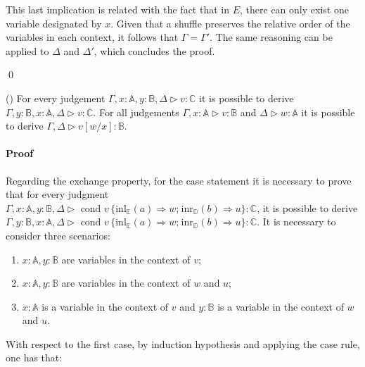 This last implication is related with the fact that in $E$, there can only exist one  variable designated by $x$. Given that a shuffle preserves the relative order of the variables in each context, it follows that $\Gamma = \Gamma'$. The same reasoning can be applied to $\Delta$ and $\Delta'$, which concludes the proof. 

\qed



\begin{lemma} \label {exh_and_sub} () For every judgement $\Gamma,x:\mathbb{A}, y:\mathbb{B}, \Delta \triangleright v: \mathbb{C}$ it is possible to derive $\Gamma, y:\mathbb{B}, x:\mathbb{A}, \Delta \triangleright v: \mathbb{C}$. For all judgements  $\Gamma,x:\mathbb{A} \triangleright v: \mathbb{B}$ and $\Delta \triangleright w: \mathbb{A}$ it is possible to derive $ \Gamma, \Delta \triangleright v[w/x]: \mathbb{B}$.
\end{lemma}

\paragraph{Proof}

Regarding the exchange property, for the case statement it is necessary to prove that for every judgment $\Gamma, x:\mathbb{A}, y:\mathbb{B}, \Delta \triangleright \text{ cond } v \hspace{2pt} \{\text{inl}_{\mathbb{E}}  (a) \Rightarrow w ; \hspace{1pt} \text{inr}_{\mathbb{D}}  (b) \Rightarrow u\}: \mathbb{C}$, it is possible to derive $\Gamma, y:\mathbb{B}, x:\mathbb{A}, \Delta \triangleright \text{ cond } v \hspace{2pt} \{\text{inl}_{\mathbb{E}} (a) \Rightarrow w ; \hspace{1pt} \text{inr}_{\mathbb{D}} (b) \Rightarrow u\}: \mathbb{C}$. It is necessary to consider three scenarios:
\begin{enumerate}
  \item $x:\mathbb{A}, y:\mathbb{B}$ are variables in the context of $v$;
  \item $x:\mathbb{A}, y:\mathbb{B}$ are variables in the context of $w$ and $u$;
  \item  $x:\mathbb{A}$ is a variable in the context of $v$ and $y:\mathbb{B}$ is a variable in the context of $w$ and $u$.
\end{enumerate}

With respect to the first case, by induction hypothesis and applying the case rule, one has that:

